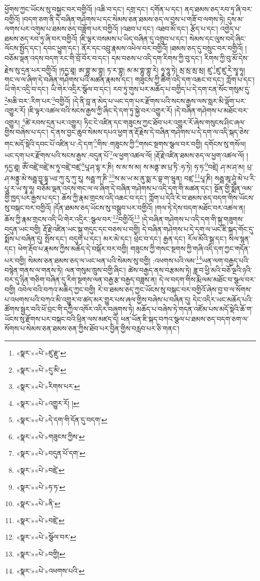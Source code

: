 ཕྱོགས་ཀྱང་ཡོངས་སུ་བསྐྱང་བར་བགྱིའོ། །འཆི་བ་དང་། དགྲ་དང་། དགོན་པ་དང་། ནད་ཐམས་ཅད་རབ་ཏུ་ཞི་བར་བགྱིའོ། །བདག་ཅག་ནི་དེ་བཞིན་གཤེགས་པ་དང་སེམས་ཅན་ཐམས་ཅད་ལ་བྱས་པ་གཟོ་བ་ལགས་ཏེ། དུས་མ་ལགས་པར་འགུམ་པ་ཐམས་ཅད་བཟློག་པར་བགྱིའོ། །འཐབ་པ་དང་། འཐབ་མོ་དང་། རྩོད་པ་དང་། འགྱེད་པ་ཐམས་ཅད་རབ་ཏུ་ཞི་བར་བགྱིའོ། །ཇི་ལྟར་བསམས་པ་ཡིད་བཞིན་དུ་འགྲུབ་པ་དང་། སེམས་དང་ལུས་བདེ་ཞིང་ལོངས་སྤྱོད་དང་། དབང་ཕྱུག་དང་། ནོར་དང་འབྲུ་རྣམས་འཕེལ་བར་བགྱིའོ། །ཐམས་ཅད་དུ་བསྲུང་བར་བགྱིའོ། །བཅོམ་ལྡན་འདས་བདག་རང་གི་བྲོ་བོར་བ་དང་། དམ་བཅས་པ་འདི་དག་རིགས་ཀྱི་བུ་དང་། རིགས་ཀྱི་བུ་མོ་དེས་རྗེས་སུ་དྲན་པར་བགྱིའོ། །ཏདྱ་ཐཱ། ཨ་གྷུ་མ་གྷུ། ཏ་ར་གྷུ། མ་མ་གྷུ་གྷུ་རེ། ཧཱ་ཧཱུ་ཏེ། མྲ་མྲ་མྲ་མྲ། ཛུ་\footnote{«སྣར་»«པེ་»ཛུ་རྫུ་}ཛུ་ཛུ་རེ་སྭཱ་ཧཱ། གང་ལ་ལ་ཞིག་དེ་བཞིན་གཤེགས་པའི་མཚན་རྣམས་དང་། གཟུངས་ཀྱི་ཚིག་འདི་དག་འཆང་བ་དང་། ཀློག་པ་དང་། ཡི་གེར་འདྲི་བ་དང་། ཡི་གེར་འདྲིར་སྩོལ་བ་དང་། རབ་ཏུ་གུས་པར་མཆོད་པ་བགྱིད་པ་དེ་དག་ངན་སོང་གསུམ་དུ་\footnote{«སྣར་»«པེ་»དུ་མི་}མཆི་བར་:རིག་པར་\footnote{«སྣར་»«པེ་»རིགས་པར་}བགྱིའོ། །དེ་ནི་བླ་ན་མེད་པ་ཡང་དག་པར་རྫོགས་པའི་སངས་རྒྱས་ལས་སླར་མི་ལྡོག་པར་འགྱུར་རོ། །ཇི་ལྟར་འཚལ་བའི་སངས་རྒྱས་ཀྱི་ཞིང་དེ་དག་ཏུ་སྐྱེ་བར་འགྱུར་རོ། །དེ་བཞིན་གཤེགས་པ་མཐོང་བར་འགྱུར། \footnote{«སྣར་»«པེ་»འགྱུར་རོ། ། }ཚེ་རབས་དྲན་པར་འགྱུར། ཏིང་ངེ་འཛིན་དང་གཟུངས་ཀྱང་ཐོབ་པར་འགྱུར་རོ་ཞེས་གསུངས་ཤིང་ཞལ་གྱིས་བཞེས་པ་དང་། དེ་ནས་བྱང་ཆུབ་སེམས་དཔའ་ཕྱག་ན་རྡོ་རྗེས་དེ་བཞིན་གཤེགས་པ་དེ་དག་ལ་འདི་སྐད་ཅེས་གང་མདོ་སྡེའི་དབང་པོ་འཛིན་པ་:དེ་དག་\footnote{«སྣར་»«པེ་»དེ་དག་གི་དོན་དུ་བདག་}གིས་:གཟུངས་ཀྱི་\footnote{«སྣར་»«པེ་»གཟུངས་ཀྱིས་}གསང་སྔགས་སྩལ་བར་བགྱི། དགོངས་སུ་གསོལ། ཡང་དག་པར་རྫོགས་པའི་སངས་རྒྱས་:བདུན་པོ་\footnote{«སྣར་»«པེ་»བདུན་པོ་དག་}ལ་ཕྱག་འཚལ་ལོ། །རྡོ་རྗེ་འཛིན་ཐམས་ཅད་ལ་ཕྱག་འཚལ་ལོ། །ཏདྱ་ཐཱ། ཨོཾ་བཛྲེ་བཛྲེ་མ་ཧཱ་བཛྲེ་བཛྲ་\footnote{«སྣར་»«པེ་»བཛྲེ་}པཱ་ཤ་དྷ་ར་ཎི། ས་མ་ས་མ། ས་མནྟ་ཨ་པྲ་ཏི་:ཧ་ཏེ། ཧ་ཧ་\footnote{«སྣར་»«པེ་»ཧ་ཏ་}བཛྲེ། ཤ་མ་ཤ་མ། པྲ་ཤ་མནྟུ་མེ་སརྦྦ་བྱཱ་དྷཱ་ཡཿ་ཀུ་རུ་ཀུ་རུ། སརྦྦ་ཀ་ཎི་\footnote{«སྣར་»«པེ་»ནི་}ས་མ་ཡ་མ་ནུ་སྨ་ར་བྷ་ག་ཝཱན། བཛྲ་\footnote{«སྣར་»«པེ་»བཛྲེ་}པཱ་ཎི། སརྦྦ་ཨཱ་ཤཱཾ་མེ་པ་རི་པཱུ་ར་ཡ་སྭཱ་ཧཱ། བཅོམ་ལྡན་འདས་གང་ལ་ལ་ཞིག་དེ་བཞིན་གཤེགས་པ་འདི་དག་གི་མཚན་དང་། སྔོན་གྱི་སྨོན་ལམ་གྱི་ཁྱད་པར་རྒྱས་པ་དང་། ཆོས་ཀྱི་རྣམ་གྲངས་འདི་འཆང་བ་དང་། ཀློག་པ་དེའི་རེ་བ་ཐམས་ཅད་བདག་གིས་ཡོངས་སུ་བསྐང་བར་བགྱིའོ། །དོན་ཐམས་ཅད་ཡོངས་སུ་བསྒྲུབ་པར་བགྱིའོ། །གལ་ཏེ་དེས་བདག་མཐོང་བར་འཚལ་ན། ཆོས་ཀྱི་རྣམ་གྲངས་འདི་ཡི་གེར་འདྲིར་:སྩལ་བར་\footnote{«སྣར་»«པེ་»སྩོལ་བར་}བགྱིའོ།\footnote{«སྣར་»«པེ་»བགྱི།} །དེ་བཞིན་གཤེགས་པ་འདི་དག་གི་སྐུ་གཟུགས་བདུན་ཡང་བགྱི། རྡོ་རྗེ་འཛིན་ཡང་སྐུ་གདུང་དང་བཅས་པ་བགྱི། དེ་བཞིན་གཤེགས་པ་དེ་དག་ལ་ཡང་ཇི་སྐད་གོང་དུ་སྨོས་པ་བཞིན་དུ། སྤོས་དང་། བདུག་པ་དང་། མར་མེ་དང་། ཕྲེང་བ་དང་། རྒྱན་དང་། རོལ་མོའི་སྒྲ་དང་། སིལ་སྙན་དང་། ཕེག་རྡོབ་པ་རྣམས་ཀྱིས་མཆོད་དེ་བསྐོར་བར་བགྱི། གཟུངས་ཀྱི་གསང་སྔགས་ཀྱི་གཞི་འདི་དག་ཀྱང་གདོན་པར་བགྱི། སེམས་ཅན་ཐམས་ཅད་ལ་ཡང་ཕན་པའི་སེམས་སུ་བགྱི། :འཕགས་པའི་ལམ་\footnote{«སྣར་»«པེ་»འཕགས་པའི་}ཡན་ལག་བརྒྱད་པའི་བསྙེན་གནས་ལ་གནས་ཏེ། ལན་གསུམ་ཁྲུས་བགྱི་ཞིང་། ཚེས་བརྒྱད་ནས་བརྩམས་ཏེ། ཟླ་བ་ཕྱི་མའི་བཅོ་ལྔའི་ཉའི་བར་དུ་ཉིན་གཅིག་བཞིན་དུ་རིག་སྔགས་ལན་བརྒྱ་རྩ་བརྒྱད་བཟླས་ན། དེ་ལ་བདག་གིས་རྨི་ལམ་མཐོང་བ་སྩལ་བར་བགྱི། འབེལ་བའི་བཀའ་མཆིད་ཀྱང་བགྱི། རེ་བ་ཐམས་ཅད་ཀྱང་ཡོངས་སུ་བསྐང་བར་བགྱིའོ་ཞེས་བྱ་བ་ལ་སོགས་པ་འཕགས་པའི་བཀའ་མི་འགྱུར་བ་ཚད་མར་གྱུར་པས་ཞལ་གྱིས་བཞེས་པ་བཞིན་དུ། དེང་འདིར་ཡང་མཆོད་པའི་ཚོགས་སྦྱར་བའི་ཕོ་བྲང་གི་དཀྱིལ་འཁོར་འདིར་བཞུགས་ཏེ། མཆོད་པ་བཞེས་ཏེ་གདན་འཛོམ་པས་མདོ་སྡེའི་ཆོ་ག་ཡོངས་སུ་རྫོགས་པར་བསྐང་བའི་ཕྲིན་ལས་མཛད་དེ། ཕན་ཡོན་ཇི་སྐད་བཀའ་སྩལ་པ་ཐམས་ཅད་བདག་ཅག་ལ་སོགས་པ་སེམས་ཅན་ཐམས་ཅན་ཀྱིས་ཐོབ་པར་བྱིན་གྱིས་བརླབ་པར་ཅི་གནང་། 